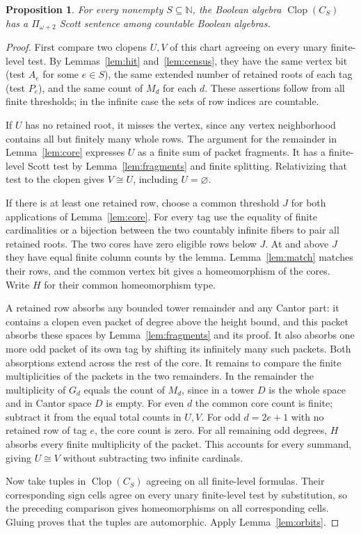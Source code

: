 \documentclass[11pt,letterpaper]{article}
\newtheorem{proposition}[theorem]{Proposition}
\theoremstyle{definition}\newtheorem{definition}[theorem]{Definition}
\newcommand{\N}{\mathbb N}
\newcommand{\Clop}{\operatorname{Clop}}
\begin{document}
\begin{proposition}\label{prop:chart}
For every nonempty \(S\subseteq\N\), the Boolean algebra \(\Clop(C_S)\)
has a \(\Pi_{\omega+2}\) Scott sentence among countable Boolean algebras.
\end{proposition}
\begin{proof}
First compare two clopens \(U,V\) of this chart agreeing on every unary
finite-level test. By Lemmas~\ref{lem:hit} and~\ref{lem:census}, they have
the same vertex bit (test \(A_e\) for some \(e\in S\)), the same extended
number of retained roots of each tag (test \(P_e\)), and the same count
of \(M_d\) for each \(d\). These assertions follow from all finite
thresholds; in the infinite case the sets of row indices are countable.

If \(U\) has no retained root, it misses the vertex, since any vertex
neighborhood contains all but finitely many whole rows. The argument for
the remainder in Lemma~\ref{lem:core} expresses \(U\) as a finite sum
of packet fragments. It has a finite-level Scott test by
Lemma~\ref{lem:fragments} and finite splitting. Relativizing that test to
the clopen gives \(V\cong U\), including \(U=\varnothing\).

If there is at least one retained row, choose a common threshold \(J\)
for both applications of Lemma~\ref{lem:core}. For every tag use the
equality of finite cardinalities or a bijection between the two countably
infinite fibers to pair all retained roots. The two cores have zero
eligible rows below \(J\). At and above \(J\) they have equal finite
column counts by the lemma. Lemma~\ref{lem:match} matches their rows,
and the common vertex bit gives a homeomorphism of the cores.
Write \(H\) for their common homeomorphism type.

A retained row absorbs any bounded tower remainder and any Cantor part:
it contains a clopen even packet of degree above the height bound, and
this packet absorbs these spaces by Lemma~\ref{lem:fragments} and its
proof. It also absorbs one more odd packet of its own tag by shifting
its infinitely many such packets. Both absorptions extend across the
rest of the core. It remains to compare the finite multiplicities of
the packets in the two remainders. In the remainder the multiplicity of
\(G_d\) equals the count of \(M_d\), since in a tower \(D\) is the whole
space and in Cantor space \(D\) is empty. For even \(d\) the common core count is finite;
subtract it from the equal total counts in \(U,V\). For odd \(d=2e+1\)
with no retained row of tag \(e\), the core count is zero. For all
remaining odd degrees, \(H\) absorbs every finite multiplicity of the
packet. This accounts for every summand, giving \(U\cong V\) without
subtracting two infinite cardinals.

Now take tuples in \(\Clop(C_S)\) agreeing on all finite-level formulas.
Their corresponding sign cells agree on every unary finite-level test
by substitution, so the preceding comparison gives homeomorphisms on
all corresponding cells. Gluing proves that the tuples are automorphic.
Apply Lemma~\ref{lem:orbits}.
\end{proof}
\end{document}
